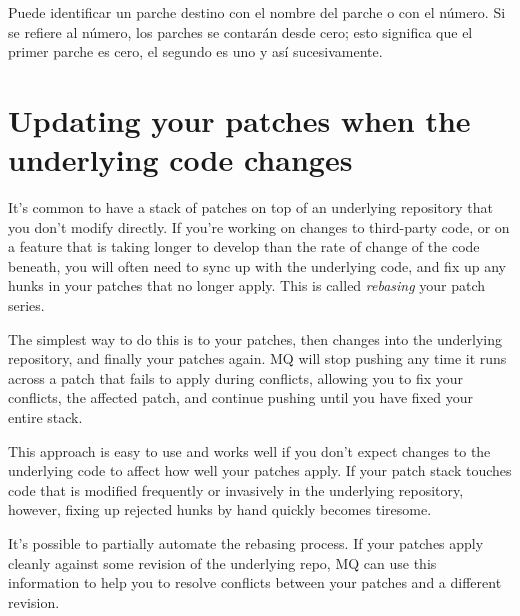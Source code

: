 Puede identificar un parche destino con el nombre del parche o con el
número.  Si se refiere al número, los parches se contarán desde cero;
esto significa que el primer parche es cero, el segundo es uno y así
sucesivamente.

\section{Updating your patches when the underlying code changes}
\label{sec:mq:merge}

It's common to have a stack of patches on top of an underlying
repository that you don't modify directly.  If you're working on
changes to third-party code, or on a feature that is taking longer to
develop than the rate of change of the code beneath, you will often
need to sync up with the underlying code, and fix up any hunks in your
patches that no longer apply.  This is called \emph{rebasing} your
patch series.

The simplest way to do this is to 
your patches, then  changes into the underlying
repository, and finally  your
patches again.  MQ will stop pushing any time it runs across a patch
that fails to apply during conflicts, allowing you to fix your
conflicts,  the affected patch, and continue pushing
until you have fixed your entire stack.

This approach is easy to use and works well if you don't expect
changes to the underlying code to affect how well your patches apply.
If your patch stack touches code that is modified frequently or
invasively in the underlying repository, however, fixing up rejected
hunks by hand quickly becomes tiresome.

It's possible to partially automate the rebasing process.  If your
patches apply cleanly against some revision of the underlying repo, MQ
can use this information to help you to resolve conflicts between your
patches and a different revision.

